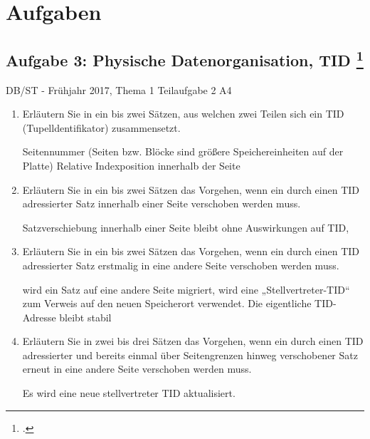 \documentclass{lehramt-informatik-haupt}
\begin{document}

\chapter{Aufgaben}

\section{Aufgabe 3: Physische Datenorganisation, TID
\footcite{db:pu:3}}

DB/ST - Frühjahr 2017, Thema 1 Teilaufgabe 2 A4

\begin{enumerate}
\item Erläutern Sie in ein bis zwei Sätzen, aus welchen zwei Teilen
sich ein TID (Tupelldentifikator) zusammensetzt.

\begin{antwort}
Seitennummer (Seiten bzw. Blöcke sind größere Speichereinheiten auf der
Platte) Relative Indexposition innerhalb der Seite
\end{antwort}

\item Erläutern Sie in ein bis zwei Sätzen das Vorgehen, wenn ein
durch einen TID adressierter Satz innerhalb einer Seite verschoben
werden muss.

\begin{antwort}
Satzverschiebung innerhalb einer Seite bleibt ohne Auswirkungen auf TID,
\end{antwort}

\item Erläutern Sie in ein bis zwei Sätzen das Vorgehen, wenn ein
durch einen TID adressierter Satz erstmalig in eine andere Seite
verschoben werden muss.

\begin{antwort}
wird ein Satz auf eine andere Seite migriert, wird eine
„Stellvertreter-TID“ zum Verweis auf den neuen Speicherort verwendet.
Die eigentliche TID-Adresse bleibt stabil
\end{antwort}

\item Erläutern Sie in zwei bis drei Sätzen das Vorgehen, wenn ein
durch einen TID adressierter und bereits einmal über Seitengrenzen
hinweg verschobener Satz erneut in eine andere Seite verschoben werden
muss.

\begin{antwort}
Es wird eine neue stellvertreter TID aktualisiert.
\end{antwort}

\end{enumerate}

\literatur
\end{document}
